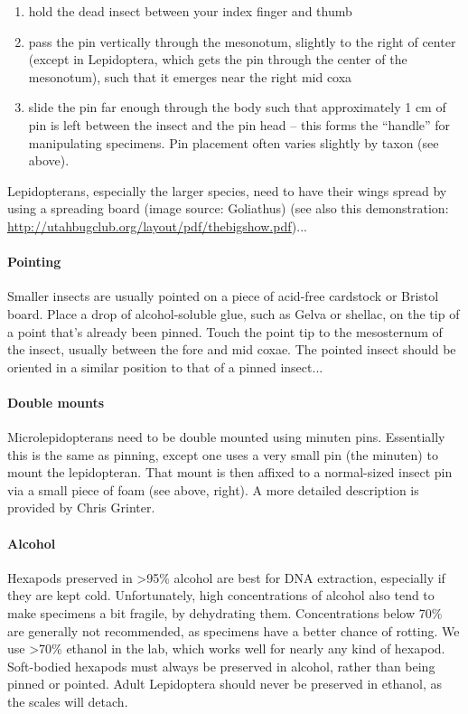 \documentclass[letterpaper, 11pt]{article}
\begin{document}
\begin{enumerate}
\item hold the dead insect between your index finger and thumb
\item pass the pin vertically through the mesonotum, slightly to the right of center (except in Lepidoptera, which gets the pin through the center of the mesonotum), such that it emerges near the right mid coxa
\item slide the pin far enough through the body such that approximately 1 cm of pin is left between the insect and the pin head – this forms the “handle” for manipulating specimens. Pin placement often varies slightly by taxon (see above).
\end{enumerate}

Lepidopterans, especially the larger species, need to have their wings spread by using a spreading board (image source: Goliathus) (see also this demonstration: \url{http://utahbugclub.org/layout/pdf/thebigshow.pdf})...\\

\paragraph*{Pointing} Smaller insects are usually pointed on a piece of acid-free cardstock or Bristol board. Place a drop of alcohol-soluble glue, such as Gelva or shellac, on the tip of a point that’s already been pinned. Touch the point tip to the mesosternum of the insect, usually between the fore and mid coxae. The pointed insect should be oriented in a similar position to that of a pinned insect...\\

\paragraph*{Double mounts} Microlepidopterans need to be double mounted using minuten pins. Essentially this is the same as pinning, except one uses a very small pin (the minuten) to mount the lepidopteran. That mount is then affixed to a normal-sized insect pin via a small piece of foam (see above, right). A more detailed description is provided by Chris Grinter.\\

\paragraph*{Alcohol} Hexapods preserved in \textgreater95\% alcohol are best for DNA extraction, especially if they are kept cold. Unfortunately, high concentrations of alcohol also tend to make specimens a bit fragile, by dehydrating them. Concentrations below 70\% are generally not recommended, as specimens have a better chance of rotting. We use \textgreater70\% ethanol in the lab, which works well for nearly any kind of hexapod. Soft-bodied hexapods must always be preserved in alcohol, rather than being pinned or pointed. Adult Lepidoptera should never be preserved in ethanol, as the scales will detach.
\end{document}
